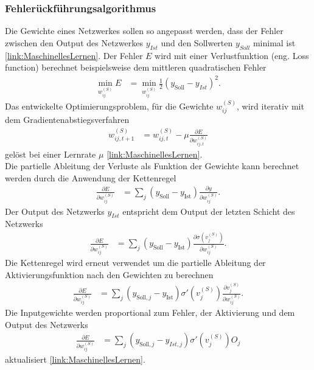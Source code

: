 \subsubsection{Fehlerückführungsalgorithmus}
Die Gewichte eines Netzwerkes sollen so angepasst werden, dass der Fehler zwischen den Output des Netzwerkes $y_{Ist}$ und den Sollwerten $y_{Soll}$ minimal ist \ref{link:MaschinellesLernen}. Der Fehler $E$ wird mit einer Verlustfunktion (eng. Loss function) berechnet beispielsweise dem mittleren quadratischen Fehler
\begin{align}
  \min_{w_{ij}^{(S)}} E &= {
    \min_{w_{ij}^{(S)}}\frac{1}{2}\left (y_{\text{Soll}} - y_{Ist}\right )^2
  }.
\end{align}
Das entwickelte Optimierungsproblem, für die Gewichte $w_{ij}^{(S)}$, wird iterativ mit dem Gradientenabstiegsverfahren 
\begin{align}
  w_{ij,t+1}^{(S)} &= {
    w_{ij, t}^{(S)} - \mu \frac{\partial E}{\partial w_{ij, t}^{(S)}}
  }
\end{align}
gelöst bei einer Lernrate $\mu $ \ref{link:MaschinellesLernen}.\\
Die partielle Ableitung der Verluste als Funktion der Gewichte kann berechnet werden durch die Anwendung der Kettenregel
\begin{align}
  \frac{\partial E}{\partial w_{ij}^{(S)}} &= {
    \sum_j \left (y_{\text{Soll}} - y_{\text{Ist}}\right )\frac{\partial y}{\partial w_{ij}^{(S)}}
  }.
\end{align}
Der Output des Netzwerks $y_{Ist}$ entspricht dem Output der letzten Schicht des Netzwerks
\begin{align}
  \frac{\partial E}{\partial w_{ij}^{(S)}} &= \sum_j \left (y_{\text{Soll}} - y_{\text{Ist}}\right )\frac{\partial \sigma \left (v_j^{(S)}\right )}{\partial w_{ij}^{(S)}}.
\end{align}
Die Kettenregel wird erneut verwendet um die partielle Ableitung der Aktivierungsfunktion nach den Gewichten zu berechnen
\begin{align}
  \frac{\partial E}{\partial w_{ij}^{(S)}} &= \sum_j \left (y_{\text{Soll},j} - y_{\text{Ist}}\right )\sigma'\left (v_j^{(S)}\right )\frac{\partial v_j^{(S)}}{\partial w_{ij}^{(S)}}.
\end{align}
Die Inputgewichte werden proportional zum Fehler, der Aktivierung und dem Output des Netzwerks
\begin{align}
  \frac{\partial E}{\partial w_{ij}^{(S)}} &= \sum_j \left (y_{\text{Soll},j} - y_{Ist, j}\right )\sigma'\left (v_j^{(S)}\right )O_j
\end{align}
aktualisiert \ref{link:MaschinellesLernen}.

